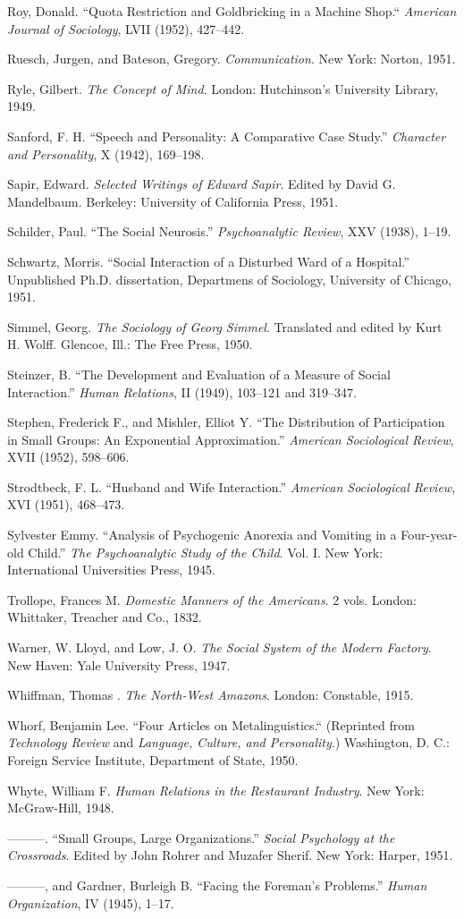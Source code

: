 \documentclass[openany,nobib]{tufte-book}
\begin{document}
\begin{hangparas}{.25in}{1}
Roy, Donald. ``Quota Restriction and Goldbricking in a Machine Shop.``
\emph{American Journal of Sociology}, LVII (1952), 427--442.

Ruesch, Jurgen, and Bateson, Gregory. \emph{Communication}. New York:
Norton, 1951.

Ryle, Gilbert. \emph{The Concept of Mind}. London: Hutchinson's
University Library, 1949.

Sanford, F. H. ``Speech and Personality: A Comparative Case Study.''
\emph{Character and Personality}, X (1942), 169--198.

Sapir, Edward. \emph{Selected Writings of Edward Sapir}. Edited by David
G. Mandelbaum. Berkeley: University of California Press, 1951.

Schilder, Paul. ``The Social Neurosis.'' \emph{Psychoanalytic Review},
XXV (1938), 1--19.

Schwartz, Morris. ``Social Interaction of a Disturbed Ward of a
Hospital.'' Unpublished Ph.D. dissertation, Departmens of Sociology,
University of Chicago, 1951.

Simmel, Georg. \emph{The Sociology of Georg Simmel}. Translated and
edited by Kurt H. Wolff. Glencoe, Ill.: The Free Press, 1950.

Steinzer, B. ``The Development and Evaluation of a Measure of Social
Interaction.'' \emph{Human Relations}, II (1949), 103--121 and 319--347.

Stephen, Frederick F., and Mishler, Elliot Y. ``The Distribution of
Participation in Small Groups: An Exponential Approximation.''
\emph{American Sociological Review}, XVII (1952), 598--606.

Strodtbeck, F. L. ``Husband and Wife Interaction.'' \emph{American
Sociological Review}, XVI (1951), 468--473.

Sylvester Emmy. ``Analysis of Psychogenic Anorexia and Vomiting in a
Four-year-old Child.'' \emph{The Psychoanalytic Study of the Child}.
Vol. I. New York: International Universities Press, 1945.

Trollope, Frances M. \emph{Domestic Manners of the Americans}. 2 vols.
London: Whittaker, Treacher and Co., 1832.

Warner, W. Lloyd, and Low, J. O. \emph{The Social System of the Modern
Factory}. New Haven: Yale University Press, 1947.

Whiffman, Thomas . \emph{The North-West Amazons}. London: Constable,
1915.

Whorf, Benjamin Lee. ``Four Articles on Metalinguistics.`` (Reprinted
from \emph{Technology Review} and \emph{Language, Culture, and
Personality}.) Washington, D. C.: Foreign Service Institute, Department
of State, 1950.

Whyte, William F. \emph{Human Relations in the Restaurant Industry}. New
York: McGraw-Hill, 1948.

---------. ``Small Groups, Large Organizations.'' \emph{Social
Psychology at the Crossroads}. Edited by John Rohrer and Muzafer Sherif.
New York: Harper, 1951.

---------, and Gardner, Burleigh B. ``Facing the Foreman's Problems.''
\emph{Human Organization}, IV (1945), 1--17.



\end{hangparas}
\end{document}
